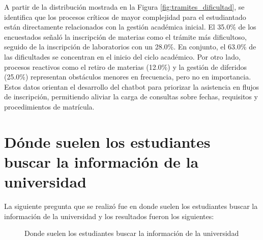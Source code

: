 {{A partir de la distribución mostrada en la Figura \ref{fig:tramites_dificultad}, se identifica que los procesos críticos de mayor complejidad para el estudiantado están directamente relacionados con la gestión académica inicial. El 35.0\% de los encuestados señaló la inscripción de materias como el trámite más dificultoso, seguido de la inscripción de laboratorios con un 28.0\%. En conjunto, el 63.0\% de las dificultades se concentran en el inicio del ciclo académico. Por otro lado, procesos reactivos como el retiro de materias (12.0\%) y la gestión de diferidos (25.0\%) representan obstáculos menores en frecuencia, pero no en importancia. Estos datos orientan el desarrollo del chatbot para priorizar la asistencia en flujos de inscripción, permitiendo aliviar la carga de consultas sobre fechas, requisitos y procedimientos de matrícula.

\section{Dónde suelen los estudiantes buscar la información de la universidad}
La siguiente pregunta que se realizó fue en donde suelen los estudiantes buscar la información de la universidad y los resultados fueron los siguientes:

\begin{figure}[H]
    \centering
    \caption{Donde suelen los estudiantes buscar la información de la universidad}
    \label{fig:donde_buscan_info}
\end{figure}

}}
